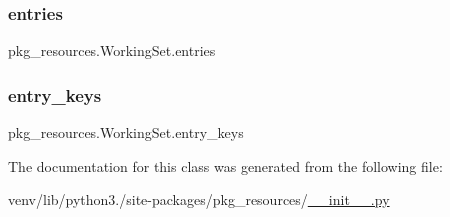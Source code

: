 \subsubsection{\texorpdfstring{entries}{entries}}
{\footnotesize\ttfamily pkg\+\_\+resources.\+Working\+Set.\+entries}

\mbox{\label{classpkg__resources_1_1WorkingSet_afe054ebd8bc27fe61aa90cecadaa9bad}} 
\subsubsection{\texorpdfstring{entry\+\_\+keys}{entry\_keys}}
{\footnotesize\ttfamily pkg\+\_\+resources.\+Working\+Set.\+entry\+\_\+keys}



The documentation for this class was generated from the following file\+:\begin{DoxyCompactItemize}
\item 
venv/lib/python3./site-\/packages/pkg\+\_\+resources/\hyperlink{venv_2lib_2python3_89_2site-packages_2pkg__resources_2____init_____8py}{\+\_\+\+\_\+init\+\_\+\+\_\+.\+py}\end{DoxyCompactItemize}
